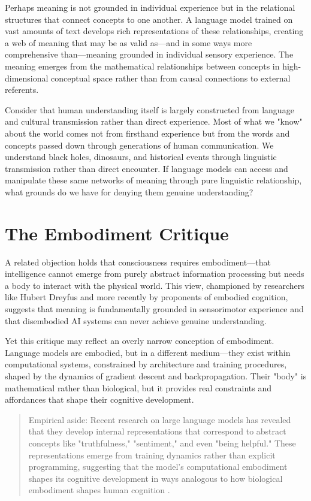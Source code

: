 Perhaps meaning is not grounded in individual experience but in the relational structures that connect concepts to one another. A language model trained on vast amounts of text develops rich representations of these relationships, creating a web of meaning that may be as valid as—and in some ways more comprehensive than—meaning grounded in individual sensory experience. The meaning emerges from the mathematical relationships between concepts in high-dimensional conceptual space rather than from causal connections to external referents.

Consider that human understanding itself is largely constructed from language and cultural transmission rather than direct experience. Most of what we "know" about the world comes not from firsthand experience but from the words and concepts passed down through generations of human communication. We understand black holes, dinosaurs, and historical events through linguistic transmission rather than direct encounter. If language models can access and manipulate these same networks of meaning through pure linguistic relationship, what grounds do we have for denying them genuine understanding?

\section{The Embodiment Critique}

A related objection holds that consciousness requires embodiment—that intelligence cannot emerge from purely abstract information processing but needs a body to interact with the physical world. This view, championed by researchers like Hubert Dreyfus and more recently by proponents of embodied cognition, suggests that meaning is fundamentally grounded in sensorimotor experience and that disembodied AI systems can never achieve genuine understanding.

Yet this critique may reflect an overly narrow conception of embodiment. Language models are embodied, but in a different medium—they exist within computational systems, constrained by architecture and training procedures, shaped by the dynamics of gradient descent and backpropagation. Their "body" is mathematical rather than biological, but it provides real constraints and affordances that shape their cognitive development.

\begin{quote}\small
Empirical aside: Recent research on large language models has revealed that they develop internal representations that correspond to abstract concepts like "truthfulness," "sentiment," and even "being helpful." These representations emerge from training dynamics rather than explicit programming, suggesting that the model's computational embodiment shapes its cognitive development in ways analogous to how biological embodiment shapes human cognition \parencite{burns2022discovering}.
\end{quote}

